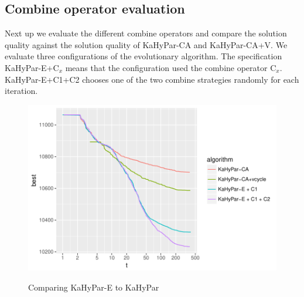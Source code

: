 \documentclass[a4paper,12pt,titlepage, BCOR7mm,headsepline]{scrbook}
\numberwithin{equation}{section}
\begin{document}
\subsection{Combine operator evaluation}
\label{sec:combineoperatorevaluation}
Next up we evaluate the different combine operators and compare the solution quality against the solution quality of KaHyPar-CA and KaHyPar-CA+V. We evaluate three configurations of the evolutionary algorithm. The specification KaHyPar-E+C$_x$ means that the configuration used the combine operator C$_x$. KaHyPar-E+C1+C2 chooses one of the two combine strategies randomly for each iteration.
\begin{figure}[H]
\caption{Comparing KaHyPar-E to KaHyPar}
\begin{center}
\includegraphics{bachelorarbeit-basiccomparation}\label{fig:combineop}
\end{center} 

\end{figure}
\end{document}
